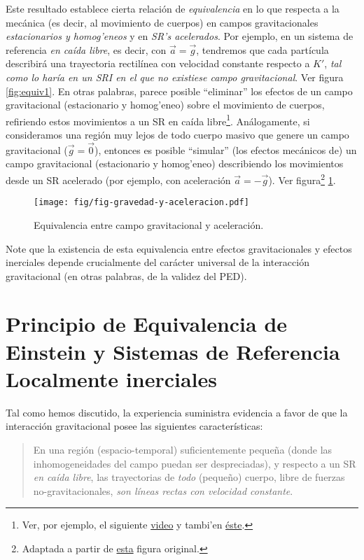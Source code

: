 Este resultado establece cierta relación de \textit{equivalencia} en lo que respecta a la mecánica (es decir, al movimiento de cuerpos) en campos gravitacionales \textit{estacionarios y homog'eneos} y en \textit{SR's acelerados}. Por ejemplo, en un sistema de referencia \textit{en caída libre}, es decir, con $\vec{a}=\vec{g}$, tendremos que cada partícula describirá una trayectoria rectilínea con velocidad constante respecto a $K'$, \textit{tal como lo haría en un SRI en el que no existiese campo gravitacional}. Ver figura \ref{fig:equiv1}.
En otras palabras, parece posible ``eliminar'' los efectos de un campo gravitacional (estacionario y homog'eneo) sobre el movimiento de cuerpos, refiriendo estos movimientos a un SR en caída libre\footnote{Ver, por ejemplo, el siguiente \href{http://youtu.be/1ieR8hIXUIg}{video} y tambi'en \href{http://youtu.be/xsNFqMtNZvI}{\'este}.}.
Análogamente, si consideramos una región muy lejos de todo cuerpo masivo que genere un campo gravitacional ($\vec{g}=\vec{0}$), entonces es posible ``simular'' (los efectos mecánicos de) un campo gravitacional (estacionario y homog'eneo) describiendo los movimientos desde un SR acelerado (por ejemplo, con aceleración $\vec{a}=-\vec{g}$). Ver figura\footnote{Adaptada a partir de  \href{http://commons.wikimedia.org/wiki/File:Elevator_gravity.svg}{esta} figura original.} \ref{fig:gya}.
\begin{figure}[H]
 \begin{center}
\texttt{[image: fig/fig-gravedad-y-aceleracion.pdf]}
\caption{Equivalencia entre campo gravitacional y aceleración.}
\label{fig:gya}
\end{center}
\end{figure}
Note que la existencia de esta equivalencia entre efectos gravitacionales y efectos inerciales depende crucialmente del carácter universal de la interacción gravitacional (en otras palabras, de la validez del PED).

\section{Principio de Equivalencia de Einstein y Sistemas de Referencia Localmente inerciales}
Tal como hemos discutido, la experiencia suministra evidencia a favor de que la interacción gravitacional posee las siguientes características:
\begin{quotation}
En una región (espacio-temporal) suficientemente peque\~na (donde las inhomogeneidades del campo puedan ser despreciadas), y respecto a un SR \textit{en caída libre}, las trayectorias de \textit{todo} (peque\~no) cuerpo, libre de fuerzas no-gravitacionales, \textit{son líneas rectas con velocidad constante}.
\end{quotation}

